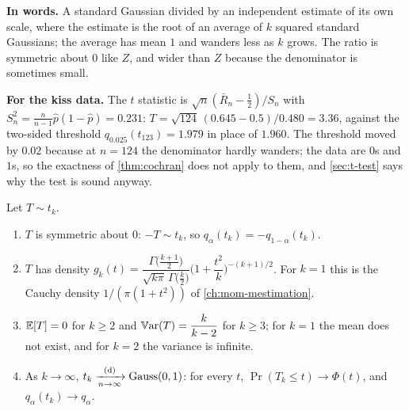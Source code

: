 \begin{inwords}
\textbf{In words.} A standard Gaussian divided by an independent estimate of its own scale, where the estimate is the root of an average of $k$ squared standard Gaussians; the average has mean $1$ and wanders less as $k$ grows. The ratio is symmetric about $0$ like $Z$, and wider than $Z$ because the denominator is sometimes small.
\par\smallskip
\textbf{For the kiss data.} The $t$ statistic is $\sqrt{n}(\bar{R}_n - \frac12)/S_n$ with $S_n^2 = \frac{n}{n-1}\hat{p}(1 - \hat{p}) = 0.231$: $T = \sqrt{124}\,(0.645 - 0.5)/0.480 = 3.36$, against the two-sided threshold $q_{0.025}(t_{123}) = 1.979$ in place of $1.960$. The threshold moved by $0.02$ because at $n = 124$ the denominator hardly wanders; the data are $0$s and $1$s, so the exactness of \cref{thm:cochran} does not apply to them, and \cref{sec:t-test} says why the test is sound anyway.
\end{inwords}

\begin{proposition}
\label{prop:student-props}
Let $T \sim t_k$.
\begin{enumerate}[nosep]
\item $T$ is symmetric about $0$: $-T \sim t_k$, so $q_\alpha(t_k) = -q_{1-\alpha}(t_k)$.
\item $T$ has density $g_k(t) = \dfrac{\Gamma\big(\frac{k+1}{2}\big)}{\sqrt{k\pi}\,\Gamma\big(\frac{k}{2}\big)}\Big(1 + \dfrac{t^2}{k}\Big)^{-(k+1)/2}$. For $k = 1$ this is the Cauchy density $1/(\pi(1 + t^2))$ of \cref{ch:mom-mestimation}.
\item $\operatorname*{\mathbb{E}}[T] = 0$ for $k \geq 2$ and $\operatorname*{\mathbb{V}\text{ar}}(T) = \dfrac{k}{k-2}$ for $k \geq 3$; for $k = 1$ the mean does not exist, and for $k = 2$ the variance is infinite.
\item As $k \to \infty$, $t_k \xrightarrow [n \to \infty ]{\text{(d)}} \text{Gauss}(0,1)$: for every $t$, $\Pr(T_k \leq t) \to \Phi(t)$, and $q_\alpha(t_k) \to q_\alpha$.
\end{enumerate}
\end{proposition}


